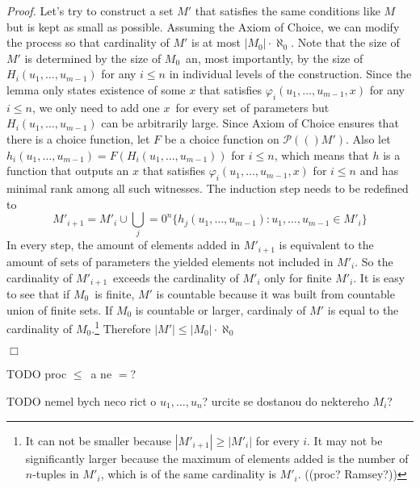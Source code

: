 \documentclass[12pt,a4paper]{article}
\newenvironment{proof}
{\noindent \textit{Proof.}}
{\hspace*{\fill} $\Box$}
\newcommand{\power}[1]{\ensuremath{\mathscr{P}} (#1)}
\begin{document}
\begin{proof}
\medskip 
Let's try to construct a set $M'$ that satisfies the same conditions like $M$ but is kept as small as possible. Assuming the Axiom of Choice, we can modify the process so that cardinality of $M'$ is at most $|M_0| \cdot \aleph_0$. Note that the size of $M'$ is determined by the size of $M_0$ an, most importantly, by the size of $H_i(u_1, \ldots, u_{m-1})$ for any $i \leq n$ in individual levels of the construction. Since the lemma only states existence of some $x$ that satisfies $\varphi_i(u_1, \ldots, u_{m-1}, x)$ for any $i \leq n$, we only need to add one $x$ for every set of parameters but $H_i(u_1, \dots, u_{m-1})$ can be arbitrarily large. Since Axiom of Choice ensures that there is a choice function, let $F$ be a choice function on $\power(M')$. Also let $h_i(u_1, \ldots, u_{m-1}) = F(H_i(u_1, \ldots, u_{m-1}))$ for $i \leq n$, which means that $h$ is a function that outputs an $x$ that satisfies $\varphi_i(u_1, \ldots, u_{m-1}, x)$ for $i \leq n$ and has minimal rank among all such witnesses. The induction step needs to be redefined to
\begin{equation}
M'_{i+1} = M'_i \cup \bigcup_j=0^n \{ h_j(u_1, \ldots, u_{m-1}): u_1, \ldots, u_{m-1} \in M'_i \}
\end{equation}
In every step, the amount of elements added in $M'_{i+1}$ is equivalent to the amount of sets of parameters the yielded elements not included in $M'_i$. So the cardinality of $M'_{i+1}$ exceeds the cardinality of $M'_i$ only for finite $M'_i$. It is easy to see that if $M_0$ is finite, $M'$ is countable because it was built from countable union of finite sets. If $M_0$ is countable or larger, cardinaly of $M'$ is equal to the cardinality of $M_0$.\footnote{It can not be smaller because $|M'_{i+1}|  \geq |M'_i|$ for every $i$. It may not be significantly larger because the maximum of elements added is the number of $n$-tuples in $M'_i$, which is of the same cardinality is $M'_i$. ((proc? Ramsey?))}
Therefore $|M'| \leq |M_0| \cdot \aleph_0$

\end{proof}
 
 
TODO proc $\leq$ a ne $=$?

TODO nemel bych neco rict o $u_1, \ldots, u_n$? urcite se dostanou do nektereho $M_i$?



\medskip
\end{document}
